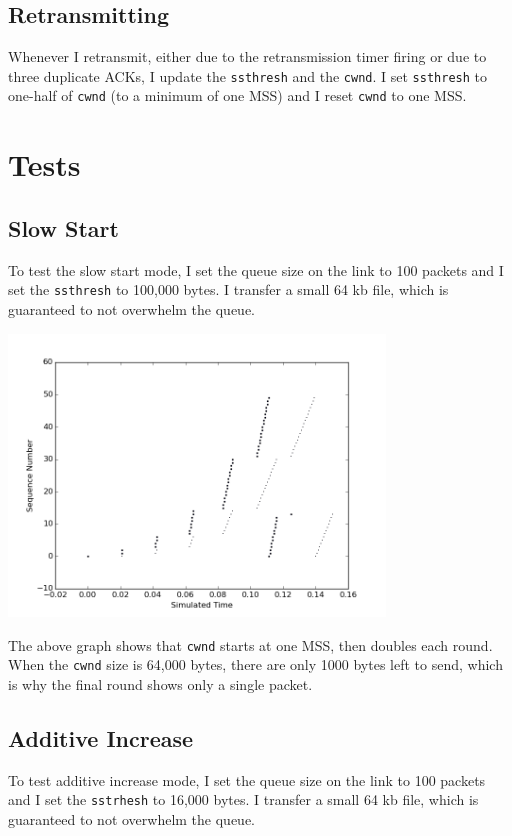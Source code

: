 \documentclass[11pt]{article}
\newcommand{\code}[1]{\texttt{#1}}
\begin{document}
\subsection{Retransmitting}
Whenever I retransmit, either due to the retransmission timer firing or due to three duplicate ACKs, I update the \code{ssthresh} and the \code{cwnd}. I set \code{ssthresh} to one-half of \code{cwnd} (to a minimum of one MSS) and I reset \code{cwnd} to one MSS.

\pagebreak
\section{Tests}

\subsection{Slow Start}
To test the slow start mode, I set the queue size on the link to 100 packets and I set the \code{ssthresh} to 100,000 bytes. I transfer a small 64 kb file, which is guaranteed to not overwhelm the queue.

\includegraphics[width=10cm]{../graphs/slow_start.png}

The above graph shows that \code{cwnd} starts at one MSS, then doubles each round. When the \code{cwnd} size is 64,000 bytes, there are only 1000 bytes left to send, which is why the final round shows only a single packet.

\subsection{Additive Increase}
To test additive increase mode, I set the queue size on the link to 100 packets and I set the \code{sstrhesh} to 16,000 bytes. I transfer a small 64 kb file, which is guaranteed to not overwhelm the queue.
\end{document}
